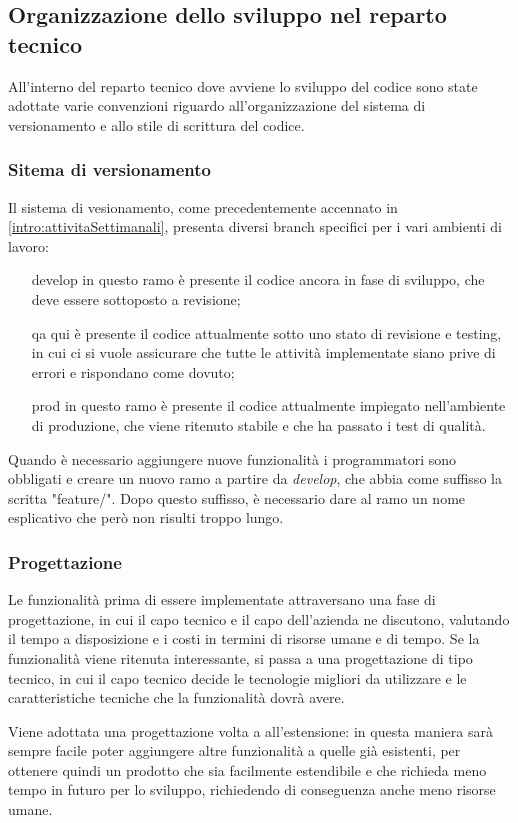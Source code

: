 \subsection{Organizzazione dello sviluppo nel reparto tecnico}
\label{intro:OrganizzazioneSviluppoRepartoTecnico}
All'interno del reparto tecnico dove avviene lo sviluppo del codice sono state
adottate varie convenzioni riguardo all'organizzazione del sistema di
versionamento e allo stile di scrittura del codice.

\subsubsection{Sitema di versionamento}
Il sistema di vesionamento, come precedentemente accennato in
\ref{intro:attivitaSettimanali}, presenta diversi branch specifici per i vari
ambienti di lavoro:
\begin{itemize}

\item[develop] in questo ramo è presente il codice ancora in fase di sviluppo,
che deve essere sottoposto a revisione;
\item[qa] qui è presente il codice attualmente sotto uno stato di revisione e
testing, in cui ci si vuole assicurare che tutte le attività implementate siano
prive di errori e rispondano come dovuto;
\item[prod] in questo ramo è presente il codice attualmente impiegato
nell'ambiente di produzione, che viene ritenuto stabile e che ha passato i test
di qualità.
\end{itemize}

Quando è necessario aggiungere nuove funzionalità i programmatori sono
obbligati e creare un nuovo ramo a partire da \textit{develop}, che abbia come
suffisso la scritta "feature/". Dopo questo suffisso, è necessario dare al ramo
un nome esplicativo che però non risulti troppo lungo.

\subsubsection{Progettazione}
Le funzionalità prima di essere implementate attraversano una fase di
progettazione, in cui il capo tecnico e il capo dell'azienda ne discutono,
valutando il tempo a disposizione e i costi in termini di risorse umane e di
tempo. Se la funzionalità viene ritenuta interessante, si passa a una
progettazione di tipo tecnico, in cui il capo tecnico decide le tecnologie
migliori da utilizzare e le caratteristiche tecniche che la funzionalità dovrà
avere.

Viene adottata una progettazione volta a all'estensione: in questa
maniera sarà sempre facile poter aggiungere altre funzionalità a quelle già
esistenti, per ottenere quindi un prodotto che sia facilmente estendibile e che
richieda meno tempo in futuro per lo sviluppo, richiedendo di conseguenza anche
meno risorse umane.

